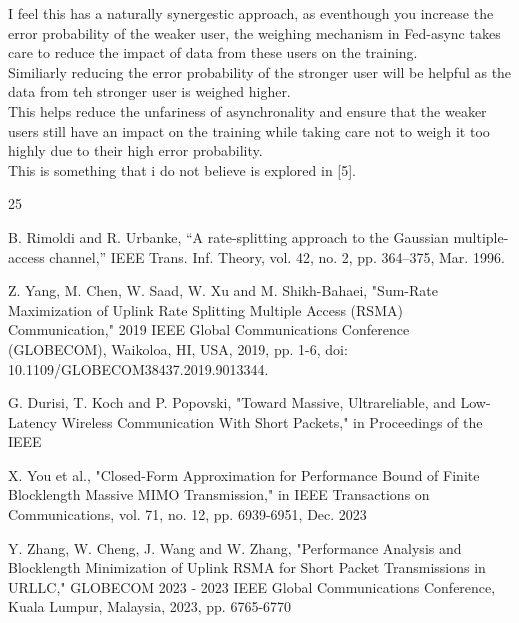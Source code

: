 \documentclass[a4paper, 12pt, onecolumn, journal, twoside, draftclsnofoot]{IEEEtran}
\begin{document}
I feel this has a naturally synergestic approach, as eventhough you increase the error probability of the weaker user, the weighing mechanism in Fed-async takes care to reduce the impact of data from these users on the training.\\

Similiarly reducing the error probability of the stronger user will be helpful as the data from teh stronger user is weighed higher. \\

This helps reduce the unfariness of asynchronality and ensure that the weaker users still have an impact on the training while taking care not to weigh it too highly due to their high error probability.\\

This is something that i do not believe is explored in [5].

\begin{thebibliography}{25} 

B. Rimoldi and R. Urbanke, “A rate-splitting approach to the Gaussian multiple-access channel,” IEEE Trans. Inf. Theory,  vol. 42, no. 2, pp. 364–375, Mar. 1996.

\bibitem{}
Z. Yang, M. Chen, W. Saad, W. Xu and M. Shikh-Bahaei, "Sum-Rate Maximization of Uplink Rate Splitting Multiple Access (RSMA) Communication," 2019 IEEE Global Communications Conference (GLOBECOM), Waikoloa, HI, USA, 2019, pp. 1-6, doi: 10.1109/GLOBECOM38437.2019.9013344.

\bibitem{}
G. Durisi, T. Koch and P. Popovski, "Toward Massive, Ultrareliable, and Low-Latency Wireless Communication With Short Packets," in Proceedings of the IEEE

\bibitem{}
X. You et al., "Closed-Form Approximation for Performance Bound of Finite Blocklength Massive MIMO Transmission," in IEEE Transactions on Communications, vol. 71, no. 12, pp. 6939-6951, Dec. 2023

\bibitem{}
Y. Zhang, W. Cheng, J. Wang and W. Zhang, "Performance Analysis and Blocklength Minimization of Uplink RSMA for Short Packet Transmissions in URLLC," GLOBECOM 2023 - 2023 IEEE Global Communications Conference, Kuala Lumpur, Malaysia, 2023, pp. 6765-6770
\end{thebibliography}
\end{document}
